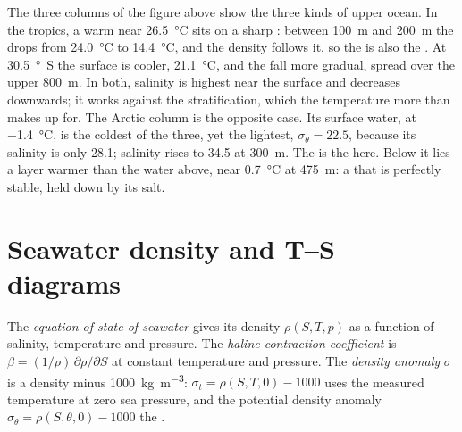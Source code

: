The three columns of the figure above show the three kinds of upper ocean. In
the tropics, a warm  near \qty{26.5}{\celsius} sits on a sharp
: between \qty{100}{m} and \qty{200}{m} the 
drops from \qty{24.0}{\celsius} to \qty{14.4}{\celsius}, and the density follows
it, so the  is also the . At \qty{30.5}{\degree S} the
surface is cooler, \qty{21.1}{\celsius}, and the fall more gradual, spread over
the upper \qty{800}{m}. In both, salinity is highest near the surface and
decreases downwards; it works against the stratification, which the temperature
more than makes up for. The Arctic column
is the opposite case. Its surface water, at \qty{-1.4}{\celsius}, is the coldest
of the three, yet the lightest, $\sigma_\theta = 22.5$, because its salinity is
only \num{28.1}; salinity rises to \num{34.5} at \qty{300}{m}. The  is
the  here. Below it lies a layer warmer than the water above, near
\qty{0.7}{\celsius} at \qty{475}{m}: a  that is perfectly
stable, held down by its salt.

\section{Seawater density and T--S diagrams}\label{sec:b1:fluid-envelopes-structure:ts}

\begin{definition}\label{def:b1:fluid-envelopes-structure:eos}
The \emph{equation of state of seawater}
gives its density $\rho(S, T, p)$ as a function of salinity, temperature and
pressure. The \emph{haline contraction coefficient} is $\beta = (1/\rho)\,\partial\rho/\partial S$ at constant
temperature and pressure. The \emph{density anomaly}
$\sigma$ is a density minus \qty{1000}{kg.m^{-3}}: $\sigma_t = \rho(S, T, 0) -
1000$ uses the measured temperature at zero sea pressure, and the potential
density anomaly $\sigma_\theta = \rho(S, \theta, 0) - 1000$ the .
\end{definition}

